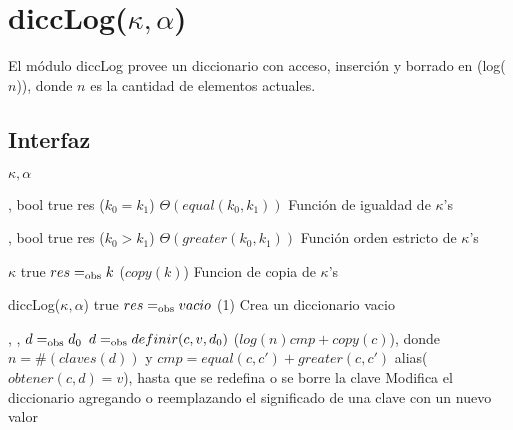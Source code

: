 \section{diccLog($\kappa, \alpha$)}

El módulo diccLog provee un diccionario con acceso, inserción y borrado en \bigo(log($n$)), donde $n$ es la cantidad de elementos actuales.

\subsection{Interfaz}

\begin{iparamformales}{$\kappa, \alpha$}

    \funcion{$\bullet = \bullet$} %
        {, } %
        {bool} %
        {true} %
        {res \igobs ($k_0 = k_1$)} %
        {$\Theta(equal(k_0, k_1))$} %
        {} %
        {Función de igualdad de $\kappa$'s} %

    \funcion{$\bullet > \bullet$} %
        {, } %
        {bool} %
        {true} %
        {res \igobs ($k_0 > k_1$)} %
        {$\Theta(greater(k_0, k_1))$} %
        {} %
        {Función orden estricto de $\kappa$'s} %

        {}
        {$\kappa$}
        {true}
        {$res =_{\mathrm{obs}} k$}
        {\bigo($copy(k)$)}
        {}
        {Funcion de copia de $\kappa$'s}


\end{iparamformales}

\iusa{}

\ioperaciones

{}
{diccLog($\kappa, \alpha$)}
{true}
{$res =_{\mathrm{obs}} vacio$}
{\bigo(1)}
{}
{Crea un diccionario vacio}

{   ,
    ,
    }
{}
{$d =_{\mathrm{obs}} d_0$}
{$d =_{\mathrm{obs}} definir(c, v, d_0)$}
{\bigo($log(n)cmp + copy(c)$), donde $n = \#(claves(d))$ y $cmp = equal(c, c')+greater(c, c')$}
{alias($obtener(c, d) = v$), hasta que se redefina o se borre la clave}
{Modifica el diccionario agregando o reemplazando el significado de una clave 
    con un nuevo valor}

